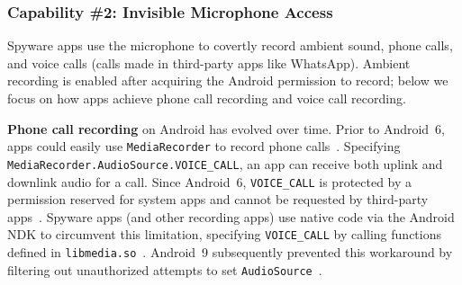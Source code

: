 \documentclass[sigconf,balance=false]{acmart}
\newcommand{\alex}[1]{\textcolor{chicagomaroon}{\noindent[AL: #1]}}
\newcommand{\geoff}[1]{\textcolor{purple}{\noindent[GV: #1]}}
\newcommand{\alex}[1]{}
\newcommand{\geoff}[1]{}
\begin{document}

\subsubsection*{Capability \#2: Invisible Microphone Access}
\label{subsubsec:audio_recording}
Spyware apps use the microphone to covertly record
ambient sound, phone calls,
and voice calls (calls made in third-party apps like WhatsApp).
Ambient recording is enabled after acquiring the Android permission
to record; below we focus on how apps achieve phone call recording and voice call
recording.

\textbf{Phone call recording} on Android has evolved over time.
%
Prior to Android~6, apps could easily use \texttt{MediaRecorder} to
record phone calls~\cite{MediaRec53:online}.
Specifying \texttt{MediaRecorder.AudioSource.VOICE\_CALL},
an app can receive both uplink and downlink audio
for a call. Since Android~6, \texttt{VOICE\_CALL} is protected by a permission
reserved for system apps and cannot be requested by third-party
apps~\cite{VOICECAL55:online}. Spyware apps (and other recording apps) use
native code via the Android NDK to circumvent this limitation, specifying
\texttt{VOICE\_CALL} by calling functions defined in
\texttt{libmedia.so}~\cite{ViktorDe77:online}.
Android~9 subsequently prevented this workaround by filtering out
unauthorized attempts to set \texttt{AudioSource}~\cite{coplukAC3:online,
  services10:online}.
\end{document}
